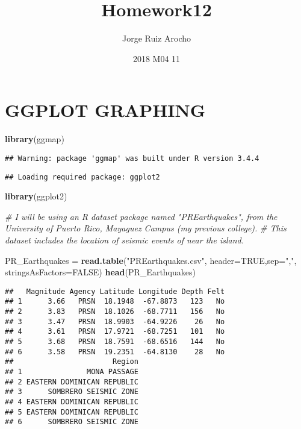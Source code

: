 \documentclass[]{article}
\title{Homework12}
\author{Jorge Ruiz Arocho}
\date{2018 M04 11}
\newenvironment{Shaded}{\begin{snugshade}}{\end{snugshade}}
\newcommand{\KeywordTok}[1]{\textcolor[rgb]{0.13,0.29,0.53}{\textbf{#1}}}
\newcommand{\DataTypeTok}[1]{\textcolor[rgb]{0.13,0.29,0.53}{#1}}
\newcommand{\StringTok}[1]{\textcolor[rgb]{0.31,0.60,0.02}{#1}}
\newcommand{\CommentTok}[1]{\textcolor[rgb]{0.56,0.35,0.01}{\textit{#1}}}
\newcommand{\OtherTok}[1]{\textcolor[rgb]{0.56,0.35,0.01}{#1}}
\newcommand{\NormalTok}[1]{#1}
\begin{document}
\maketitle

\section{GGPLOT GRAPHING}\label{ggplot-graphing}

\begin{Shaded}
\begin{Highlighting}[]
\KeywordTok{library}\NormalTok{(ggmap)}
\end{Highlighting}
\end{Shaded}

\begin{verbatim}
## Warning: package 'ggmap' was built under R version 3.4.4
\end{verbatim}

\begin{verbatim}
## Loading required package: ggplot2
\end{verbatim}

\begin{Shaded}
\begin{Highlighting}[]
\KeywordTok{library}\NormalTok{(ggplot2)}
\end{Highlighting}
\end{Shaded}

\begin{Shaded}
\begin{Highlighting}[]
\CommentTok{# I will be using an R dataset package named "PREarthquakes", from the University of Puerto Rico, Mayaguez Campus (my previous college). }
\CommentTok{# This dataset includes the location of seismic events of near the island.}

\NormalTok{PR_Earthquakes =}\StringTok{ }\KeywordTok{read.table}\NormalTok{(}\StringTok{"PREarthquakes.csv"}\NormalTok{, }\DataTypeTok{header=}\OtherTok{TRUE}\NormalTok{,}\DataTypeTok{sep=}\StringTok{","}\NormalTok{, }\DataTypeTok{stringsAsFactors=}\OtherTok{FALSE}\NormalTok{)}
\KeywordTok{head}\NormalTok{(PR_Earthquakes)}
\end{Highlighting}
\end{Shaded}

\begin{verbatim}
##   Magnitude Agency Latitude Longitude Depth Felt
## 1      3.66   PRSN  18.1948  -67.8873   123   No
## 2      3.83   PRSN  18.1026  -68.7711   156   No
## 3      3.47   PRSN  18.9903  -64.9226    26   No
## 4      3.61   PRSN  17.9721  -68.7251   101   No
## 5      3.68   PRSN  18.7591  -68.6516   144   No
## 6      3.58   PRSN  19.2351  -64.8130    28   No
##                       Region
## 1               MONA PASSAGE
## 2 EASTERN DOMINICAN REPUBLIC
## 3      SOMBRERO SEISMIC ZONE
## 4 EASTERN DOMINICAN REPUBLIC
## 5 EASTERN DOMINICAN REPUBLIC
## 6      SOMBRERO SEISMIC ZONE
\end{verbatim}
\end{document}

